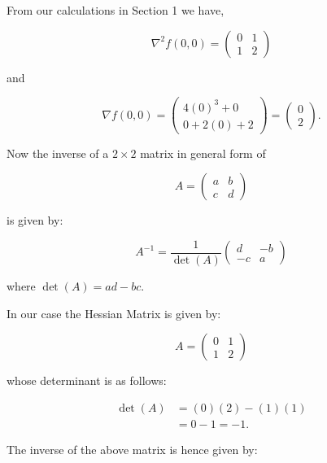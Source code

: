 \documentclass{article}
\begin{document}
From our calculations in Section 1 we have,

\begin{equation}
\nabla^2 f(0,0) =
\begin{pmatrix}
0 & 1 \\
1 & 2
\end{pmatrix}
\end{equation}

and

\begin{equation}
\nabla f(0,0) =
\begin{pmatrix}
4(0)^3 + 0 \\
0 + 2(0) + 2
\end{pmatrix}
=
\begin{pmatrix}
0 \\
2
\end{pmatrix}.
\end{equation}

Now the inverse of a \( 2 \times 2 \) matrix in general form of

\begin{equation}
A =
\begin{pmatrix}
a & b \\
c & d
\end{pmatrix}
\end{equation}

is given by:

\begin{equation}
A^{-1} = \frac{1}{\det(A)}
\begin{pmatrix}
d & -b \\
-c & a
\end{pmatrix}
\end{equation}

where \( \det(A) = ad - bc \).

In our case the Hessian Matrix is given by:

\begin{equation}
A = 
\begin{pmatrix}
0 & 1 \\
1 & 2
\end{pmatrix}
\end{equation}

whose determinant is as follows:

\begin{align*}
\det(A) &= (0)(2) - (1)(1) \\
&= 0 - 1 = -1.
\end{align*}

The inverse of the above matrix is hence given by:
\end{document}
